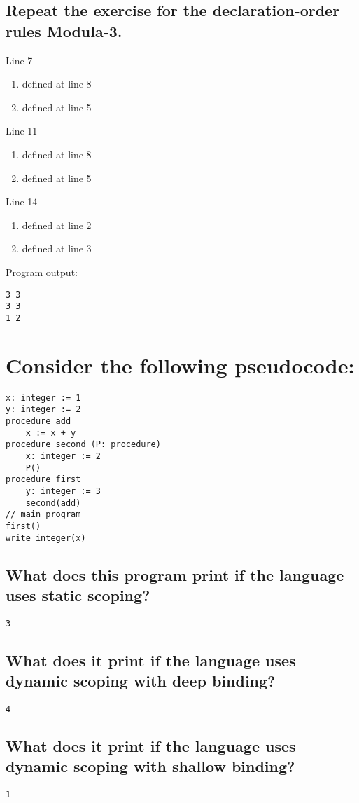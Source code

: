 \documentclass[letterpaper]{article}
\begin{document}
\subsection{Repeat the exercise for the declaration-order rules Modula-3.}
\begin{adjustwidth}{2.35em}{0pt}
Line 7
\begin{enumerate}[label=\alph*]
\item defined at line 8
\item defined at line 5
\end{enumerate}
Line 11
\begin{enumerate}[label=\alph*]
\item defined at line 8
\item defined at line 5
\end{enumerate}
Line 14
\begin{enumerate}[label=\alph*]
\item defined at line 2
\item defined at line 3
\end{enumerate}
Program output:
\begin{Verbatim}
3 3
3 3
1 2
\end{Verbatim}
\end{adjustwidth}

\section{Consider the following pseudocode:}
\begin{adjustwidth}{2.35em}{0pt}
\begin{Verbatim}[tabsize=4]
x: integer := 1
y: integer := 2
procedure add
	x := x + y
procedure second (P: procedure)
	x: integer := 2
	P()
procedure first
	y: integer := 3
	second(add)
// main program
first()
write integer(x)
\end{Verbatim}
\end{adjustwidth}
\subsection{What does this program print if the language uses static scoping?}
\begin{adjustwidth}{2.35em}{0pt}
\begin{Verbatim}[tabsize=4]
3
\end{Verbatim}
\end{adjustwidth}
\subsection{What does it print if the language uses dynamic scoping with deep binding?}
\begin{adjustwidth}{2.35em}{0pt}
\begin{Verbatim}[tabsize=4]
4
\end{Verbatim}
\end{adjustwidth}
\subsection{What does it print if the language uses dynamic scoping with shallow binding?}
\begin{adjustwidth}{2.35em}{0pt}
\begin{Verbatim}[tabsize=4]
1
\end{Verbatim}
\end{adjustwidth}
\end{document}
